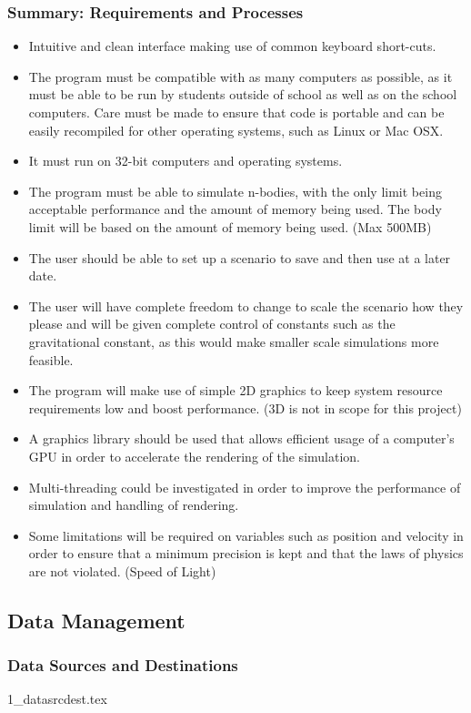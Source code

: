 \subsubsection{Summary: Requirements and Processes}
\begin{itemize}
\item Intuitive and clean interface making use of common keyboard short-cuts.
\item The program must be compatible with as many computers as possible, as it must be able to be run by students outside of school as well as on the school computers. Care must be made to ensure that code is portable and can be easily recompiled for other operating systems, such as Linux or Mac OSX.
\item It must run on 32-bit computers and operating systems.
\item The program must be able to simulate n-bodies, with the only limit being acceptable performance and the amount of memory being used. The body limit will be based on the amount of memory being used. (Max 500MB)
\item The user should be able to set up a scenario to save and then use at a later date.
\item The user will have complete freedom to change to scale the scenario how they please and will be given complete control of constants such as the gravitational constant, as this would make smaller scale simulations more feasible.
\item The program will make use of simple 2D graphics to keep system resource requirements low and boost performance. (3D is not in scope for this project)
\item A graphics library should be used that allows efficient usage of a computer's GPU in order to accelerate the rendering of the simulation.
\item Multi-threading could be investigated in order to improve the performance of simulation and handling of rendering.
\item Some limitations will be required on variables such as position and velocity in order to ensure that a minimum precision is kept and that the laws of physics are not violated. (Speed of Light)
\end{itemize}

\subsection{Data Management}
\subsubsection{Data Sources and Destinations}
{1_datasrcdest.tex}
